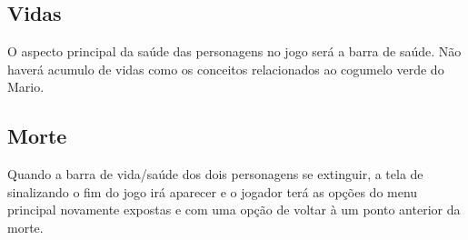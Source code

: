 \documentclass[12pt]{article}
\begin{document}
\subsection{Vidas}
O aspecto principal da saúde das personagens no jogo será a barra de saúde.
Não haverá acumulo de vidas como os conceitos relacionados ao cogumelo verde
do Mario.

\subsection{Morte}
Quando a barra de vida/saúde dos dois personagens se extinguir, a tela de
sinalizando o fim do jogo irá aparecer e o jogador terá as opções do menu
principal novamente expostas e com uma opção de voltar à um ponto anterior
da morte.
\end{document}
